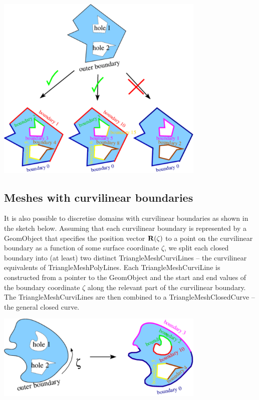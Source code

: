  
\begin{DoxyImage}
\includegraphics[width=0.75\textwidth]{polygonal_mesh}
\end{DoxyImage}




\hypertarget{index_curvilinear}{}\subsection{Meshes with curvilinear boundaries}\label{index_curvilinear}
It is also possible to discretise domains with curvilinear boundaries as shown in the sketch below. Assuming that each curvilinear boundary is represented by a {\ttfamily Geom\+Object} that specifies the position vector $ {\bf R}(\zeta) $ to a point on the curvilinear boundary as a function of some surface coordinate $ \zeta $, we split each closed boundary into (at least) two distinct {\ttfamily Triangle\+Mesh\+Curvi\+Lines} -- the curvilinear equivalents of {\ttfamily Triangle\+Mesh\+Poly\+Lines}. Each {\ttfamily Triangle\+Mesh\+Curvi\+Line} is constructed from a pointer to the {\ttfamily Geom\+Object} and the start and end values of the boundary coordinate $ \zeta $ along the relevant part of the curvilinear boundary. The {\ttfamily Triangle\+Mesh\+Curvi\+Lines} are then combined to a {\ttfamily Triangle\+Mesh\+Closed\+Curve} -- the general closed curve.

 
\begin{DoxyImage}
\includegraphics[width=0.75\textwidth]{curvilinear_mesh}
\end{DoxyImage}


